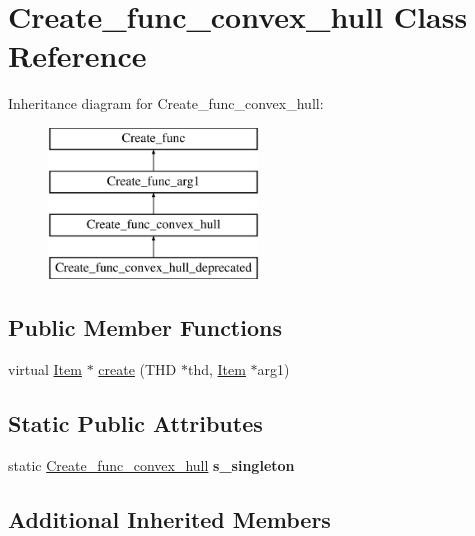 \hypertarget{classCreate__func__convex__hull}{}\section{Create\+\_\+func\+\_\+convex\+\_\+hull Class Reference}
\label{classCreate__func__convex__hull}
Inheritance diagram for Create\+\_\+func\+\_\+convex\+\_\+hull\+:\begin{figure}[H]
\begin{center}
\leavevmode
\includegraphics[height=4.000000cm]{classCreate__func__convex__hull}
\end{center}
\end{figure}
\subsection*{Public Member Functions}
\begin{DoxyCompactItemize}
\item 
virtual \mbox{\hyperlink{classItem}{Item}} $\ast$ \mbox{\hyperlink{classCreate__func__convex__hull_ad215a1f74dc69316aa8e64e577964935}{create}} (T\+HD $\ast$thd, \mbox{\hyperlink{classItem}{Item}} $\ast$arg1)
\end{DoxyCompactItemize}
\subsection*{Static Public Attributes}
\begin{DoxyCompactItemize}
\item 
\mbox{\label{classCreate__func__convex__hull_a2772431bc29a0d1b939cc71f73eb2d16}} 
static \mbox{\hyperlink{classCreate__func__convex__hull}{Create\+\_\+func\+\_\+convex\+\_\+hull}} {\bfseries s\+\_\+singleton}
\end{DoxyCompactItemize}
\subsection*{Additional Inherited Members}



